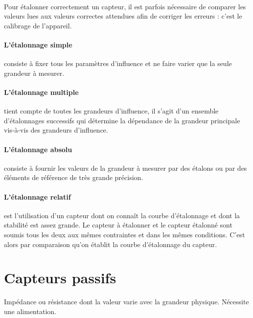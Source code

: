 \documentclass{article}
\begin{document}
        \paragraph{}
        Pour étalonner correctement un capteur, il est parfois nécessaire de comparer les valeurs lues aux valeurs correctes attendues afin de corriger les erreurs : c'est le calibrage de l'appareil.

        \paragraph{L'étalonnage simple} consiste à fixer tous les paramètres d'influence et ne faire varier que la seule grandeur à mesurer.

        \paragraph{L'étalonnage multiple} tient compte de toutes les grandeurs d'influence, il s'agit d'un ensemble d'étalonnages successifs qui détermine la dépendance de la grandeur principale vis-à-vis des grandeurs d'influence.

        \paragraph{L'étalonnage absolu} consiste à fournir les valeurs de la grandeur à mesurer par des étalons ou par des éléments de référence de très grande précision.

        \paragraph{L'étalonnage relatif} est l'utilisation d'un capteur dont on connaît la courbe d'étalonnage et dont la stabilité est assez grande. Le capteur à étalonner et le capteur étalonné sont soumis tous les deux aux mêmes contraintes et dans les mêmes conditions. C'est alors par comparaison qu'on établit la courbe d'étalonnage du capteur.

\newpage
\section{Capteurs passifs}
\paragraph{}
Impédance ou résistance dont la valeur varie avec la grandeur physique. Nécessite une alimentation.
\end{document}
